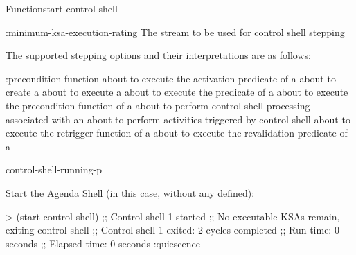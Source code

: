 \documentclass[10pt,twoside,english,pdftex]{article}
\begin{document}
\begin{functiondoc}{Function}{start-control-shell}
\begin{keywords}{:minimum-ksa-execution-rating}
   The stream to be used for control shell stepping

\end{keywords}


%
%
%
The supported stepping options and their interpretations are as follows:
\begin{keywords}{:precondition-function}
 about to execute the activation
predicate of a 
\keyword[:ks-activation] about to create a 
 about to execute a 
 about to execute the 
predicate of a 
 about to execute the precondition
function of a  
 about to perform control-shell processing
associated with an 
\keyword[:quiescence] about to perform activities triggered by 
control-shell  
 about to execute the retrigger
function of a  
 about to execute the revalidation predicate
of a  
\end{keywords}


\begin{alsos}{control-shell-running-p}
\end{alsos}

\fnexamples
Start the Agenda Shell (in this case, without any  defined):
%
\W\supp
\begin{example}
> (start-control-shell)
;; Control shell 1 started
;; No executable KSAs remain, exiting control shell
;; Control shell 1 exited: 2 cycles completed
;; Run time: 0 seconds
;; Elapsed time: 0 seconds
:quiescence
\end{example}


\end{functiondoc}
\end{document}

